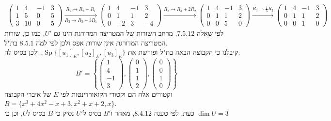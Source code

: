 \documentclass{article}
\DeclareMathOperator\Sp{Sp}
\begin{document}
\begin{align*}
    \begin{pmatrix}
        1 & 4  & -1 & 3 \\
        1 & 5  & 0  & 5 \\
        3 & 10 & 0  & 5
    \end{pmatrix}
    \xrightarrow[R_3\rightarrow R_3-3R_1]{R_2\rightarrow R_2-R_1}
    \begin{pmatrix}
        1 & 4  & -1 & 3  \\
        0 & 1  & 1  & 2  \\
        0 & -2 & 3  & -4
    \end{pmatrix}
    \xrightarrow[]{R_3\rightarrow R_3+2R_2}
    \begin{pmatrix}
        1 & 4 & -1 & 3 \\
        0 & 1 & 1  & 2 \\
        0 & 0 & 5  & 0
    \end{pmatrix}
    \xrightarrow[]{R_3\rightarrow \frac{1}{5}R_3}
    \begin{pmatrix}
        1 & 4 & -1 & 3 \\
        0 & 1 & 1  & 2 \\
        0 & 0 & 1  & 0
    \end{pmatrix}
\end{align*}
לפי שאלה $7.5.12$, מרחב השורות של המטריצה המדורגת הינו גם $U'$. כמו כן, שורות המטריצה המדורגת אינן שורות אפס ולכן לפי למה $8.5.1$ בת"ל. \\
קיבלנו כי הקבוצה הבאה בת"ל ופורשת את $\Sp\{ [u_1]_E, [u_2]_E, [u_3]_E \}$, ולכן בסיס לה:
\[
    B'=\left\{
    \begin{pmatrix}
        1  \\
        4  \\
        -1 \\
        3
    \end{pmatrix},
    \begin{pmatrix}
        0 \\
        1 \\
        1 \\
        2
    \end{pmatrix},
    \begin{pmatrix}
        0 \\
        0 \\
        1 \\
        0
    \end{pmatrix}
    \right\}
\]
וקטורים אלה הם וקטורי הקואורדינטות לפי $E$ של איברי הקבוצה $B=\{x^3+4x^2-x+3, x^2+x+2, x\}$.\\
כעת, לפי טענה $8.4.12$, מאחר ו$B'$ בסיס ל$U'$ נסיק כי $B$ בסיס ל$U$,
וכן כי $\dim U=3$
\end{document}
